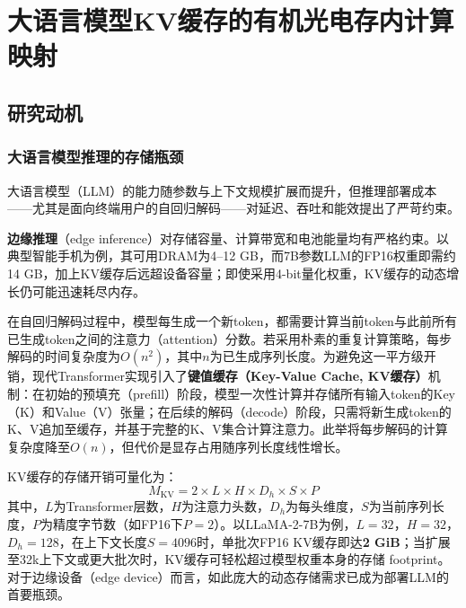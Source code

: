 
\chapter{大语言模型KV缓存的有机光电存内计算映射}
\label{ch:work2_scope}

\section{研究动机}
\label{sec:work2_motivation}

\subsection{大语言模型推理的存储瓶颈}

大语言模型（LLM）的能力随参数与上下文规模扩展而提升，但推理部署成本——尤其是面向终端用户的自回归解码——对延迟、吞吐和能效提出了严苛约束。

\textbf{边缘推理}（edge inference）对存储容量、计算带宽和电池能量均有严格约束。以典型智能手机为例，其可用DRAM为4–12 GB，而7B参数LLM的FP16权重即需约14 GB，加上KV缓存后远超设备容量；即使采用4-bit量化权重，KV缓存的动态增长仍可能迅速耗尽内存。

在自回归解码过程中，模型每生成一个新token，都需要计算当前token与此前所有已生成token之间的注意力（attention）分数。若采用朴素的重复计算策略，每步解码的时间复杂度为$O(n^2)$，其中$n$为已生成序列长度。为避免这一平方级开销，现代Transformer实现引入了\textbf{键值缓存（Key-Value Cache, KV缓存）}机制：在初始的预填充（prefill）阶段，模型一次性计算并存储所有输入token的Key（K）和Value（V）张量；在后续的解码（decode）阶段，只需将新生成token的K、V追加至缓存，并基于完整的K、V集合计算注意力。此举将每步解码的计算复杂度降至$O(n)$，但代价是显存占用随序列长度线性增长。

KV缓存的存储开销可量化为：
\begin{equation}
M_{\text{KV}} = 2 \times L \times H \times D_h \times S \times P
\label{eq:kv_memory}
\end{equation}
其中，$L$为Transformer层数，$H$为注意力头数，$D_h$为每头维度，$S$为当前序列长度，$P$为精度字节数（如FP16下$P=2$）。以LLaMA-2-7B为例，$L=32$，$H=32$，$D_h=128$，在上下文长度$S=4096$时，单批次FP16 KV缓存即达\textbf{2 GiB}；当扩展至32k上下文或更大批次时，KV缓存可轻松超过模型权重本身的存储 footprint。对于边缘设备（edge device）而言，如此庞大的动态存储需求已成为部署LLM的首要瓶颈。

